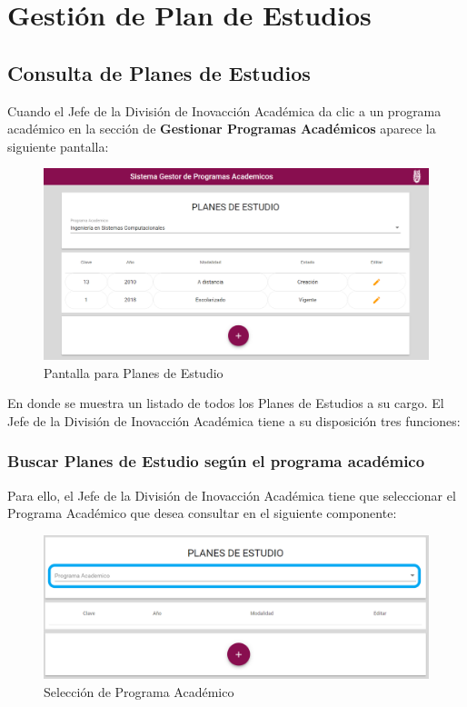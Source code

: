 
\section{Gestión de Plan de Estudios}
\subsection{Consulta de Planes de Estudios}
Cuando el Jefe de la División de Inovacción Académica da clic a un programa académico en la sección de \textbf{Gestionar Programas Académicos} aparece la siguiente pantalla:


\begin{figure}[H]
	\centering
	\hypertarget{consultarPE}{\includegraphics[width=0.7\linewidth]{images/SP4-GPE/consultar}}
	\caption{Pantalla para Planes de Estudio}
	\label{consultarPE}
\end{figure}

En donde se muestra un listado de todos los Planes de Estudios a su cargo. El Jefe de la División de Inovacción Académica tiene a su disposición tres funciones:

\subsubsection{Buscar Planes de Estudio según el programa académico}

Para ello, el Jefe de la División de Inovacción Académica tiene que seleccionar el Programa Académico que desea consultar en el siguiente componente:

\begin{figure}[H]
	\centering
	\hypertarget{academico}{\includegraphics[width=0.7\linewidth]{images/SP4-GPE/programa}}
	\caption{Selección de Programa Académico}
	\label{academico}
\end{figure}

